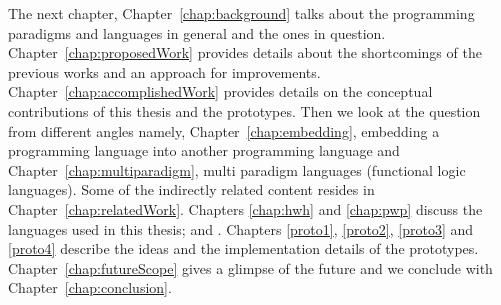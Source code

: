 \documentclass[thesis-solanki.tex]{subfiles}
\begin{document}
The next chapter, Chapter~\ref{chap:background} talks about the programming paradigms and languages in general and
the ones in question.
Chapter~\ref{chap:proposedWork} provides details about the shortcomings of the previous works and an approach for
improvements.
Chapter~\ref{chap:accomplishedWork} provides details on the conceptual contributions of this thesis and the
prototypes.
Then we look at the question from different angles namely, Chapter~\ref{chap:embedding},  embedding a programming
language into another programming language and  Chapter~\ref{chap:multiparadigm}, multi paradigm languages
(functional logic languages).
Some of the indirectly related content resides in Chapter~\ref{chap:relatedWork}.
Chapters \ref{chap:hwh} and \ref{chap:pwp} discuss the languages used in this thesis;  and
.
Chapters \ref{proto1}, \ref{proto2}, \ref{proto3} and \ref{proto4} describe the ideas and the implementation
details of the prototypes.
Chapter~\ref{chap:futureScope} gives a glimpse of the future and we conclude with
Chapter~\ref{chap:conclusion}.


\ifMain\ifDraft
\begin{scope}
  \nolinenumbers
  \enotesize
  \par
  \begin{singlespace}
  \setlength{\parskip}{12pt plus 2pt minus 1pt}
  \theendnotes
  \par
  \end{singlespace}
\end{scope}
\fi\fi
\end{document}

